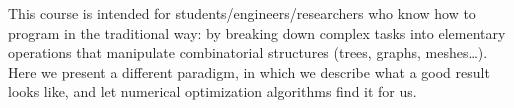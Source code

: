 \documentclass[notitlepage,oneside]{book}
\begin{document}





This course is intended for students/engineers/researchers who know how to program in the traditional way:
by breaking down complex tasks into elementary operations that manipulate combinatorial structures (trees, graphs, meshes\dots).
Here we present a different paradigm, in which we describe what a good result looks like, and let numerical optimization algorithms find it for us.
\end{document}
